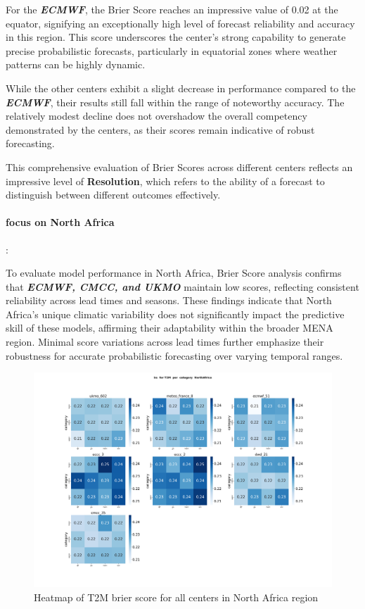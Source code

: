For the \textbf{\textit{ECMWF}}, the Brier Score reaches an impressive value of 0.02 at the equator, signifying an exceptionally high level of forecast reliability and accuracy in this region. This score underscores the center's strong capability to generate precise probabilistic forecasts, particularly in equatorial zones where weather patterns can be highly dynamic.

While the other centers exhibit a slight decrease in performance compared to the \textbf{\textit{ECMWF}}, their results still fall within the range of noteworthy accuracy. The relatively modest decline does not overshadow the overall competency demonstrated by the centers, as their scores remain indicative of robust forecasting.

This comprehensive evaluation of Brier Scores across different centers reflects an impressive level of \textbf{Resolution}, which refers to the ability of a forecast to distinguish between different outcomes effectively. 

\paragraph{focus on North Africa}:

To evaluate model performance in North Africa, Brier Score analysis confirms that \textbf{\textit{ECMWF, CMCC, and UKMO}} maintain low scores, reflecting consistent reliability across lead times and seasons. These findings indicate that North Africa’s unique climatic variability does not significantly impact the predictive skill of these models, affirming their adaptability within the broader MENA region. Minimal score variations across lead times further emphasize their robustness for accurate probabilistic forecasting over varying temporal ranges.

\begin{figure}[H]
\includegraphics[scale=0.3]{plots/prob/bs/bs_T2M_category_NorthAfrica.png}

\caption{Heatmap of T2M  brier score for all centers in North Africa region}
\end{figure}





